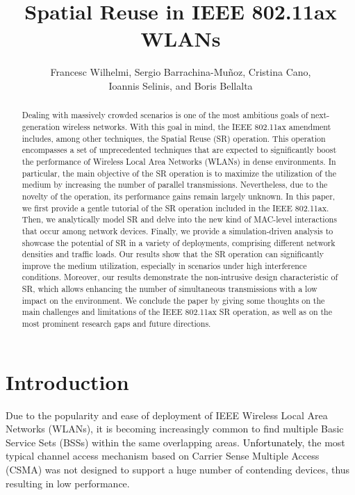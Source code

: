 \documentclass{article}
\begin{document}
\title{Spatial Reuse in IEEE 802.11ax WLANs}
\author{Francesc Wilhelmi, Sergio Barrachina-Mu\~noz, Cristina Cano,\\ Ioannis Selinis, and Boris Bellalta}
\date{ }
\maketitle

\begin{abstract}
Dealing with massively crowded scenarios is one of the most ambitious goals of next-generation wireless networks. With this goal in mind, the IEEE 802.11ax amendment includes, among other techniques, the Spatial Reuse (SR) operation. This operation encompasses a set of unprecedented techniques that are expected to significantly boost the performance of Wireless Local Area Networks (WLANs) in dense environments. In particular, the main objective of the SR operation is to maximize the utilization of the medium by increasing the number of parallel transmissions. Nevertheless, due to the novelty of the operation, its performance gains remain largely unknown. In this paper, we first provide a gentle tutorial of the SR operation included in the IEEE 802.11ax. Then, we analytically model SR and delve into the new kind of MAC-level interactions that occur among network devices. Finally, we provide a simulation-driven analysis to showcase the potential of SR in a variety of deployments, comprising different network densities and traffic loads. Our results show that the SR operation can significantly improve the medium utilization, especially in scenarios under high interference conditions. Moreover, our results demonstrate the non-intrusive design characteristic of SR, which allows enhancing the number of simultaneous transmissions with a low impact on the environment. We conclude the paper by giving some thoughts on the main challenges and limitations of the IEEE 802.11ax SR operation, as well as on the most prominent research gaps and future directions. %
\end{abstract}

\section{Introduction}
\label{section:intro}

Due to the popularity and ease of deployment of IEEE Wireless Local Area Networks (WLANs), it is becoming increasingly common to find multiple Basic Service Sets (BSSs) within the same overlapping areas. \textcolor{black}{Unfortunately}, the most typical channel access mechanism based on Carrier Sense Multiple Access (CSMA) was not designed to support a huge number of contending devices, thus resulting in low performance.
\end{document}
